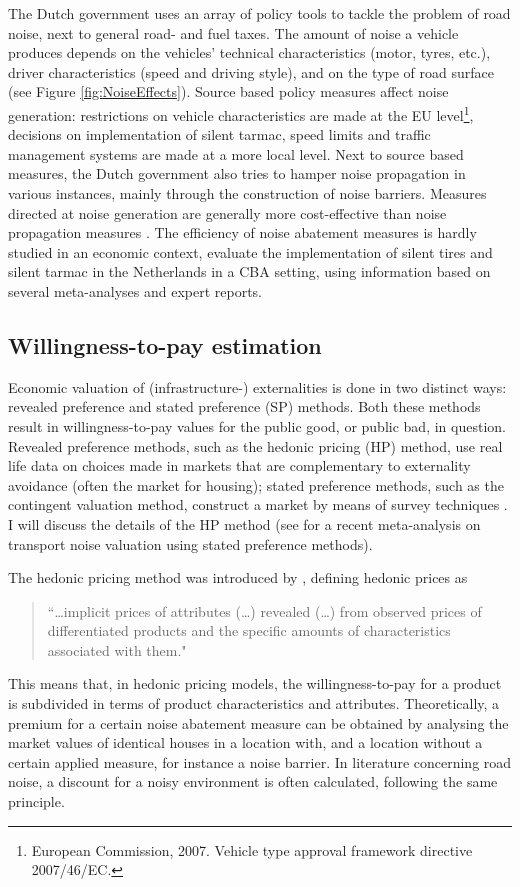 \documentclass[12pt,a4paper]{scrartcl}
\begin{document}
		The Dutch government uses an array of policy tools to tackle the problem of road noise, next to general road- and fuel taxes. The amount of noise a vehicle produces depends on the vehicles' technical characteristics (motor, tyres, etc.), driver characteristics (speed and driving style), and on the type of road surface \citep{Nijland2003} (see Figure \ref{fig:NoiseEffects}). Source based policy measures affect noise generation: restrictions on vehicle characteristics are made at the EU level\footnote{European Commission, 2007.  Vehicle type approval framework directive 2007/46/EC.}, decisions on implementation of silent tarmac, speed limits and traffic management systems are made at a more local level. Next to source based measures, the Dutch government also tries to hamper noise propagation in various instances, mainly through the construction of noise barriers. Measures directed at noise generation are generally more cost-effective than noise propagation measures \citep{DenBoer2007}. The efficiency of noise abatement measures is hardly studied in an economic context, \cite{Nijland2003} evaluate the implementation of silent tires and silent tarmac in the Netherlands in a CBA setting, using information based on several meta-analyses and expert reports.
	
		\subsection{Willingness-to-pay estimation}

		Economic valuation of (infrastructure-) externalities is done in two distinct ways: revealed preference and stated preference (SP) methods. Both these methods result in willingness-to-pay values for the public good, or public bad, in question. Revealed preference methods, such as the hedonic pricing (HP) method, use real life data on choices made in markets that are complementary to externality avoidance (often the market for housing); stated preference methods, such as the contingent valuation method, construct a market by means of survey techniques \citep{Nelson2008}. I will discuss the details of the HP method (see \cite{Bristow2014} for a recent meta-analysis on transport noise valuation using stated preference methods). 
		
		The hedonic pricing method was introduced by \cite{Rosen1974}, defining hedonic prices as
		\begin{quote}``\dots implicit prices of attributes (\dots) revealed (\dots) from observed prices of differentiated products and the specific amounts of characteristics associated with them."\end{quote} 
		This means that, in hedonic pricing models, the willingness-to-pay for a product is subdivided in terms of product characteristics and attributes. Theoretically, a premium for a certain noise abatement measure can be obtained by analysing the market values of identical houses in a location with, and a location without a certain applied measure, for instance a noise barrier. In literature concerning road noise, a discount for a noisy environment is often calculated, following the same principle.
		
\end{document}
